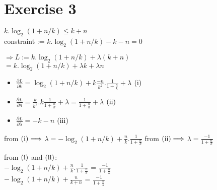 \documentclass[a4paper,
twoside, %
headlines=2.1 %
]{scrartcl}
\begin{document}
\newpage

\section*{Exercise 3}

\newcommand{\RN}[1]{%
\textup{\uppercase\expandafter{\romannumeral#1}}%
}
$k.\log_{2}{(1+n/k)} \leq k +n$
\\ 
constraint := $k.\log_{2}{(1+n/k)}  -k -n = 0$
\\ 
\begin{center}
$\Longrightarrow L:= k.\log_{2}{(1+n/k)} + \lambda(k+n)$ \\
$ = k.\log_{2}{(1+n/k)} +\lambda k + \lambda n$ 
\end{center}
\begin{itemize}
\item $\frac{\partial L}{\partial k} =  \log_{2}{(1+n/k)} + k \frac{-n}{k^{2}} . \frac{1}{1 + \frac{n}{k}}+ \lambda $ \tab\tab $(\RN{1})$\\

\item $\frac{\partial L}{\partial n} =  \frac{k}{k^{2}} . k \frac{1}{1+ \frac{n}{k}} + \lambda = \frac{1}{1+ \frac{n}{k}} + \lambda $ \tab\tab $(\RN{2})$\\

\item $\frac{\partial L}{\partial \lambda} =  -k-n$ \tab\tab $(\RN{3})$ \\
\end{itemize}
from $(\RN{1}) \Longrightarrow$ $ \lambda =  - \log_{2}{(1+n/k)} + \frac{n}{k} . \frac{1}{1 + \frac{n}{k}} $
\newline
from $(\RN{2}) \Longrightarrow$ $ \lambda =  \frac{-1}{1 + \frac{n}{k}} $
\newline

\begin{center}
from $(\RN{1}) $ and $ (\RN{2})$:
\\ $ - \log_{2}{(1+n/k)} + \frac{n}{k} . \frac{1}{1 + \frac{n}{k}} $ = $\frac{-1}{1 + \frac{n}{k}} $
\\
$ - \log_{2}{(1+n/k)} + \frac{n}{k + n} $ = $\frac{-1}{1 + \frac{n}{k}} $

\end{center}
\end{document}
